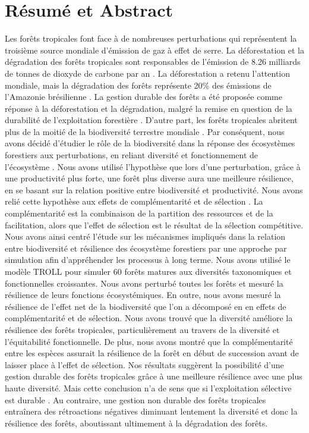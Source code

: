 \documentclass[12pt,]{article}
\let\oldsection\section
\renewcommand\section{\newpage\oldsection}
\theoremstyle{definition}
\theoremstyle{definition}
\theoremstyle{remark}
\begin{document}
\tableofcontents

\section*{Résumé et Abstract}\label{resume-et-abstract}

Les forêts tropicales font face à de nombreuses perturbations qui
représentent la troisième source mondiale d'émission de gaz à effet de
serre. La déforestation et la dégradation des forêts tropicales sont
responsables de l'émission de 8.26 milliards de tonnes de dioxyde de
carbone par an \citep{Pearson2017}. La déforestation a retenu
l'attention mondiale, mais la dégradation des forêts représente 20\% des
émissions de l'Amazonie brésilienne \citep{Asner2005}. La gestion
durable des forêts a été proposée comme réponse à la déforestation et la
dégradation, malgré la remise en question de la durabilité de
l'exploitation forestière \citep{Zimmerman2012}. D'autre part, les
forêts tropicales abritent plus de la moitié de la biodiversité
terrestre mondiale \citep{Scheffers2012}. Par conséquent, nous avons
décidé d'étudier le rôle de la biodiversité dans la réponse des
écosystèmes forestiers aux perturbations, en reliant diversité et
fonctionnement de l'écosystème \citep{Loreau2010}. Nous avons utilisé
l'hypothèse que lors d'une perturbation, grâce à une productivité plus
forte, une forêt plus diverse aura une meilleure résilience, en se
basant sur la relation positive entre biodiversité et productivité. Nous
avons relié cette hypothèse aux effets de complémentarité et de
sélection \citep{Loreau2001}. La complémentarité est la combinaison de
la partition des ressources et de la facilitation, alors que l'effet de
sélection est le résultat de la sélection compétitive. Nous avons ainsi
centré l'étude sur les mécanismes impliqués dans la relation entre
biodiversité et résilience des écosystème forestiers par une approche
par simulation afin d'appréhender les processus à long terme. Nous avons
utilisé le modèle TROLL \citep{Li} pour simuler 60 forêts matures aux
diversités taxonomiques et fonctionnelles croissantes. Nous avons
perturbé toutes les forêts et mesuré la résilience de leurs fonctions
écosystémiques. En outre, nous avons mesuré la résilience de l'effet net
de la biodiversité que l'on a décomposé en en effets de complémentarité
et de sélection. Nous avons trouvé que la diversité améliore la
résilience des forêts tropicales, particulièrement au travers de la
diversité et l'équitabilité fonctionnelle. De plus, nous avons montré
que la complémentarité entre les espèces assurait la résilience de la
forêt en début de succession avant de laisser place à l'effet de
sélection. Nos résultats suggèrent la possibilité d'une gestion durable
des forêts tropicales grâce à une meilleure résilience avec une plus
haute diversité. Mais cette conclusion n'a de sens que si l'exploitation
sélective est durable \citep{Zimmerman2012}. Au contraire, une gestion
non durable des forêts tropicales entraînera des rétroactions négatives
diminuant lentement la diversité et donc la résilience des forêts,
aboutissant ultimement à la dégradation des forêts.
\end{document}
